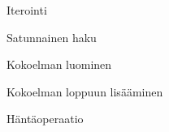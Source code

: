 \begin{figure}
    \centering
    
    \caption{Iterointi}\label{iterointi_kaavio}
\end{figure}

\begin{figure}
    \centering
    
    \caption{Satunnainen haku}\label{satunnainenHaku_kaavio}
\end{figure}

\begin{figure}
    \centering
    
    \caption{Kokoelman luominen}\label{kokoelmanLuominen_kaavio}
\end{figure}

\begin{figure}
    \centering
    
    \caption{Kokoelman loppuun lisääminen}\label{kokoelmanLoppuunLisaaminen_kaavio}
\end{figure}

\begin{figure}
    \centering
    
    \caption{Häntäoperaatio}\label{hantaoperaatio_kaavio}
\end{figure}

